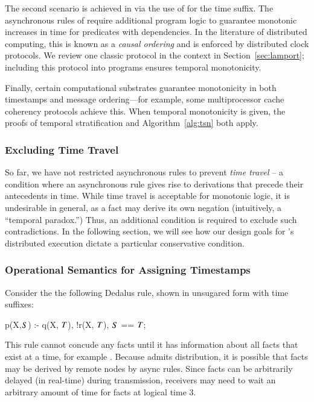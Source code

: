 The second scenario is achieved in \slang via the use of  for the time suffix. The asynchronous rules of \lang require additional program logic to guarantee monotonic increases in time for predicates with dependencies.  In the literature of distributed computing, this is known as a {\em causal ordering} and is enforced by distributed clock protocols.  We review one classic protocol in the \lang context in Section~\ref{sec:lamport}; including this protocol into \lang programs ensures temporal monotonicity.

Finally, certain computational substrates guarantee monotonicity in both timestamps and message ordering---for example, some multiprocessor cache coherency protocols achieve this.  When temporal monotonicity is given, the proofs of temporal stratification and Algorithm~\ref{alg:tsn} both apply.

\subsubsection{Excluding Time Travel}

So far, we have not restricted asynchronous rules to prevent {\em time travel} -- a condition where an asynchronous rule gives rise to derivations that precede their antecedents in time.  While time travel is acceptable for monotonic logic, it is undesirable in general, as a fact may derive its own negation (intuitively, a ``temporal paradox.'')  Thus, an additional condition is required to exclude such contradictions.  In the following section, we will see how our design goals for \lang's distributed execution dictate a particular conservative condition.

\subsubsection{Operational Semantics for Assigning Timestamps}

Consider the the following Dedalus rule, shown in unsugared form with time suffixes: 
\begin{Dedalus}
p(X,\(S\)) :- q(X, \(T\)), !r(X, \(T\)), \(S\) == \(T\);
\end{Dedalus}
This rule cannot concude any  facts until it has information about all  facts that exist at a time, for example . Because \lang admits distribution, it is possible that  facts may be derived by remote nodes by async rules.  Since facts can be arbitrarily delayed (in real-time) during transmission, receivers may need to wait an arbitrary amount of time for  facts at logical time 3.

